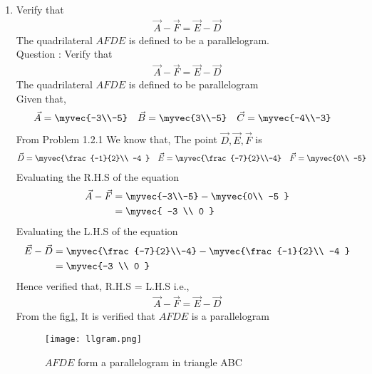 \documentclass[11pt]{book}
\begin{document}
\begin{enumerate}[label=\thesection.\arabic*.,ref=\thesection.\theenumi]
\item Verify that 
		\begin{align}
\vec{A}-\vec{F}=\vec{E}-\vec{D}
		\end{align}
The quadrilateral $AFDE$ is defined to be a parallelogram.\\
Question : Verify that 
\begin{align}
	\vec{A}-\vec{F} = \vec{E}-\vec{D}
\end{align}
The quadrilateral $AFDE$ is defined to be parallelogram
\\ \solution 
Given that,
\begin{align}
    \vec{A} = \myvec{-3\\-5}
    \quad
    \vec{B} &= \myvec{3\\-5}
    \quad
    \vec{C} = \myvec{-4\\-3}
\end{align}
From Problem 1.2.1 We know that, The point $\vec{D},\vec{E},\vec{F}$ is 
\begin{align}
    \vec{D} = \myvec{\frac{-1}{2}\\ -4 }
    \quad
    \vec{E} &= \myvec{\frac{-7}{2}\\-4}
    \quad
    \vec{F} = \myvec{0\\ -5}
\end{align}
Evaluating the R.H.S of the equation
\begin{align}
    \vec{A}-\vec{F}&=\myvec{-3\\-5}-\myvec{0\\ -5 }\\
    &=\myvec{ -3 \\ 0 }
\end{align} 
Evaluating the L.H.S of the equation
\begin{align}
    \vec{E}-\vec{D}&=\myvec{\frac{-7}{2}\\-4}-\myvec{\frac{-1}{2}\\ -4 }\\
    &=\myvec{-3 \\ 0 }
\end{align}
Hence verified that, R.H.S = L.H.S i.e.,
\begin{align}
	\vec{A}-\vec{F} = \vec{E}-\vec{D}
\end{align}
From the fig\ref{fig:Triangle}, It is verified that $AFDE$ is a parallelogram
\begin{figure}
\centering
\texttt{[image: llgram.png]}
\caption{$AFDE$ form a parallelogram in triangle ABC}
\label{fig:Triangle}
\end{figure}
\end{enumerate}














%
\end{document}
